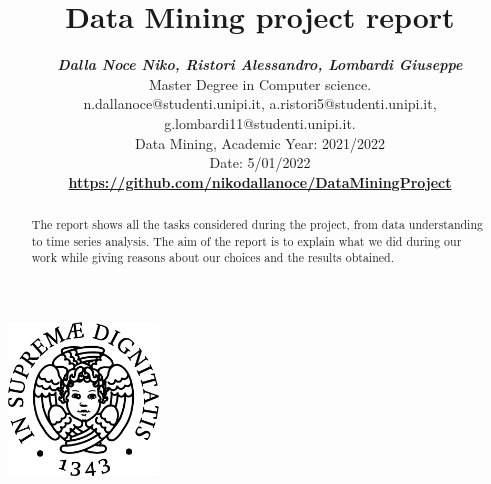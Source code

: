 \documentclass[11pt, letterpaper]{article}  %
\title{\vspace{-2cm}\textbf{Data Mining project report}}
\author{\textbf{\small{\textit{Dalla Noce Niko, Ristori Alessandro, Lombardi Giuseppe}}} \\ %
        \small{Master Degree in Computer science.}\\ \small{{n.dallanoce@studenti.unipi.it, a.ristori5@studenti.unipi.it, g.lombardi11@studenti.unipi.it}.} \\  %
        \small{Data Mining, Academic Year: 2021/2022} \\
        \small{Date: 5/01/2022} \\
       \textbf{\small{\url{https://github.com/nikodallanoce/DataMiningProject}}}
}
\begin{document}
\nocite{*}  %
\date{}
\maketitle
\begin{center}
    \includegraphics[width=0.3\textwidth]{images/unipi.png}\\
    \vspace{0.5cm}
\end{center}
\begin{abstract}
The report shows all the tasks considered during the project, from data understanding to time series analysis. The aim of the report is to explain what we did during our work while giving reasons about our choices and the results obtained.
\end{abstract}
\thispagestyle{empty}
\newpage
\thispagestyle{empty}
\tableofcontents
\thispagestyle{empty}
\newpage
{}






\end{document}
